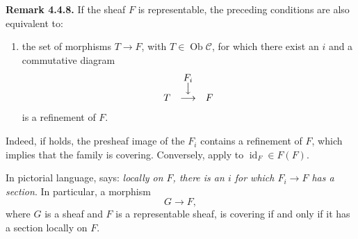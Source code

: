 \medskip
\noindent{}\textbf{Remark 4.4.8.}
If the sheaf \(F\) is representable, the preceding conditions are also
equivalent to:
\begin{enumerate}
  \item[(viii)] the set of morphisms \(T\to F\), with
    \(T\in\operatorname{Ob}\mathscr C\), for which there exist an \(i\) and
    a commutative diagram
    \[
    \begin{array}{ccc}
       &F_i&\\[-0.4ex]
       &\big\downarrow&\\[-0.4ex]
      T&\longrightarrow&F
    \end{array}
    \]
    is a refinement of \(F\).
\end{enumerate}

Indeed, if  holds, the presheaf image of the \(F_i\) contains a refinement of \(F\), which implies that the family is covering.
Conversely, apply  to \(\operatorname{id}_F\in F(F)\).

In pictorial language,  says: \textit{locally on \(F\), there
is an \(i\) for which \(F_i\to F\) has a section}. In particular, a morphism
\[
  G\longrightarrow F,
\]
where \(G\) is a sheaf and \(F\) is a representable sheaf, is covering if
and only if it has a section locally on \(F\).
